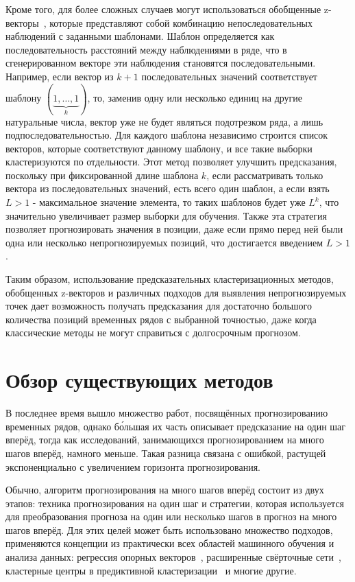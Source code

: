 \documentclass[a4paper, 12pt]{extarticle}
\begin{document}
Кроме того, для более сложных случаев могут использоваться обобщенные z-векторы~\cite{Small05}, которые представляют собой комбинацию непоследовательных наблюдений с заданными шаблонами. Шаблон определяется как последовательность расстояний между наблюдениями в ряде, что в сгенерированном векторе эти наблюдения становятся последовательными. Например, если вектор из $k+1$ последовательных значений соответствует шаблону $(\underbrace{1,\ldots,1}_{k})$, то, заменив одну или несколько единиц на другие натуральные числа, вектор уже не будет являться подотрезком ряда, а лишь подпоследовательностью. Для каждого шаблона независимо строится список векторов, которые соответствуют данному шаблону, и все такие выборки кластеризуются по отдельности. Этот метод позволяет улучшить предсказания, поскольку при фиксированной длине шаблона $k$, если рассматривать только вектора из последовательных значений, есть всего один шаблон, а если взять $L>1$ - максимальное значение элемента, то таких шаблонов будет уже $L^k$, что значительно увеличивает размер выборки для обучения. Также эта стратегия позволяет прогнозировать значения в позиции, даже если прямо перед ней были одна или несколько непрогнозируемых позиций, что достигается введением $L>1$.

Таким образом, использование предсказательных кластеризационных методов, обобщенных z-векторов и различных подходов для выявления непрогнозируемых точек дает возможность получать предсказания для достаточно большого количества позиций временных рядов с выбранной точностью, даже когда классические методы не могут справиться с долгосрочным прогнозом.

\newpage
\section{Обзор существующих методов}

В последнее время вышло множество работ, посвящённых прогнозированию временных рядов, однако б\'{о}льшая их часть описывает предсказание на один шаг вперёд, тогда как исследований, занимающихся прогнозированием на много шагов вперёд, намного меньше. Такая разница связана с ошибкой, растущей экспоненциально с увеличением горизонта прогнозирования.

Обычно, алгоритм прогнозирования на много шагов вперёд состоит из двух этапов: техника прогнозирования на один шаг и стратегии, которая используется для преобразования прогноза на один или несколько шагов в прогноз на много шагов вперёд. Для этих целей может быть использовано множество подходов, применяются концепции из практически всех областей машинного обучения и анализа данных: регрессия опорных векторов~\cite{Bao14}, расширенные свёрточные сети~\cite{Wang20}, кластерные центры в предиктивной кластеризации~\cite{Gromov17} и многие другие.
\end{document}
